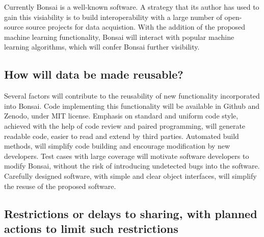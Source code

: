 \documentclass[a4paper,11pt]{article}
\begin{document}


Currently Bonsai is a well-known software. A strategy that its author has
used to gain this visiability is to build interoperability with a large number
of open-source source projects for data acquistion. With the addition of the
proposed machine learning functionality, Bonsai will interact with popular
machine learning algorithms, which will confer Bonsai further visibility.


\subsection{How will data be made reusable?}


Several factors will contribute to the reusability of new functionality
incorporated into Bonsai. Code implementing this functionality will be
available in Github and Zenodo, under MIT license. Emphasis on standard and
uniform code style, achieved with the help of code review and paired
programming, will generate readable code, easier to read and extend by third
parties. Automated build methods, will simplify code building and encourage
modification by new developers. Test cases with large coverage will motivate
software developers to modify Bonsai, without the risk of introducing
undetected bugs into the software. Carefully designed software, with simple and
clear object interfaces, will simplify the resuse of the proposed software.

\subsection{Restrictions or delays to sharing, with planned actions to limit such restrictions} 
\end{document}
